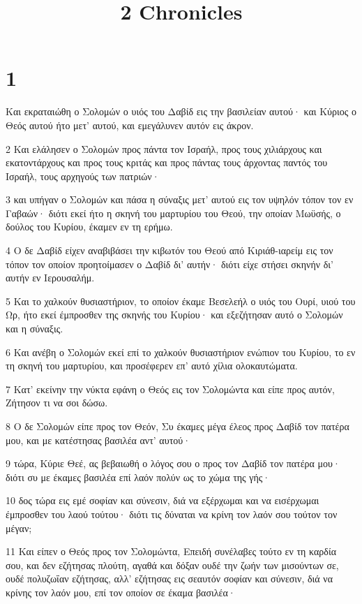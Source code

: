 

\title{2 Chronicles}


\chapter{1}

\par Και εκραταιώθη ο Σολομών ο υιός του Δαβίδ εις την βασιλείαν αυτού· και Κύριος ο Θεός αυτού ήτο μετ' αυτού, και εμεγάλυνεν αυτόν εις άκρον.
\par 2 Και ελάλησεν ο Σολομών προς πάντα τον Ισραήλ, προς τους χιλιάρχους και εκατοντάρχους και προς τους κριτάς και προς πάντας τους άρχοντας παντός του Ισραήλ, τους αρχηγούς των πατριών·
\par 3 και υπήγαν ο Σολομών και πάσα η σύναξις μετ' αυτού εις τον υψηλόν τόπον τον εν Γαβαών· διότι εκεί ήτο η σκηνή του μαρτυρίου του Θεού, την οποίαν Μωϋσής, ο δούλος του Κυρίου, έκαμεν εν τη ερήμω.
\par 4 Ο δε Δαβίδ είχεν αναβιβάσει την κιβωτόν του Θεού από Κιριάθ-ιαρείμ εις τον τόπον τον οποίον προητοίμασεν ο Δαβίδ δι' αυτήν· διότι είχε στήσει σκηνήν δι' αυτήν εν Ιερουσαλήμ.
\par 5 Και το χαλκούν θυσιαστήριον, το οποίον έκαμε Βεσελεήλ ο υιός του Ουρί, υιού του Ωρ, ήτο εκεί έμπροσθεν της σκηνής του Κυρίου· και εξεζήτησαν αυτό ο Σολομών και η σύναξις.
\par 6 Και ανέβη ο Σολομών εκεί επί το χαλκούν θυσιαστήριον ενώπιον του Κυρίου, το εν τη σκηνή του μαρτυρίου, και προσέφερεν επ' αυτό χίλια ολοκαυτώματα.
\par 7 Κατ' εκείνην την νύκτα εφάνη ο Θεός εις τον Σολομώντα και είπε προς αυτόν, Ζήτησον τι να σοι δώσω.
\par 8 Ο δε Σολομών είπε προς τον Θεόν, Συ έκαμες μέγα έλεος προς Δαβίδ τον πατέρα μου, και με κατέστησας βασιλέα αντ' αυτού·
\par 9 τώρα, Κύριε Θεέ, ας βεβαιωθή ο λόγος σου ο προς τον Δαβίδ τον πατέρα μου· διότι συ με έκαμες βασιλέα επί λαόν πολύν ως το χώμα της γής·
\par 10 δος τώρα εις εμέ σοφίαν και σύνεσιν, διά να εξέρχωμαι και να εισέρχωμαι έμπροσθεν του λαού τούτου· διότι τις δύναται να κρίνη τον λαόν σου τούτον τον μέγαν;
\par 11 Και είπεν ο Θεός προς τον Σολομώντα, Επειδή συνέλαβες τούτο εν τη καρδία σου, και δεν εζήτησας πλούτη, αγαθά και δόξαν ουδέ την ζωήν των μισούντων σε, ουδέ πολυζωΐαν εζήτησας, αλλ' εζήτησας εις σεαυτόν σοφίαν και σύνεσιν, διά να κρίνης τον λαόν μου, επί τον οποίον σε έκαμα βασιλέα·
